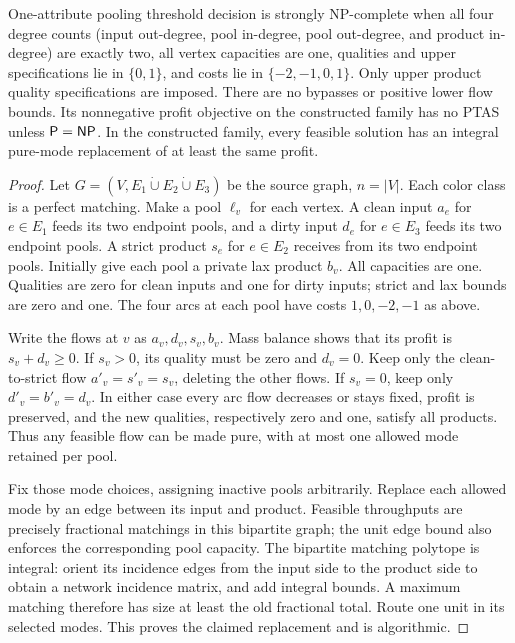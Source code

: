 \begin{theorem}\label{s3:all-two-thm}
One-attribute pooling threshold decision is strongly NP-complete when all
four degree counts (input out-degree, pool in-degree, pool out-degree,
and product in-degree)
are exactly two, all vertex capacities are one, qualities and upper
specifications lie in $\{0,1\}$, and costs lie in $\{-2,-1,0,1\}$.
Only upper product quality specifications are imposed. There are no
bypasses or positive lower flow bounds. Its nonnegative
profit objective on the constructed family has no PTAS unless
$\mathsf P=\mathsf{NP}$. In the constructed family, every feasible solution has an integral
pure-mode replacement of at least the same profit.
\end{theorem}
\begin{proof}
Let $G=(V,E_1\mathbin{\dot\cup}E_2\mathbin{\dot\cup}E_3)$ be the
source graph, $n=|V|$. Each color class is a perfect matching. Make a
pool $\ell_v$ for each vertex. A clean input $a_e$ for $e\in E_1$
feeds its two endpoint pools, and a dirty input $d_e$ for $e\in E_3$
feeds its two endpoint pools. A strict product $s_e$ for $e\in E_2$
receives from its two endpoint pools. Initially give each pool a private
lax product $b_v$. All capacities are one. Qualities are zero for clean
inputs and one for dirty inputs; strict and lax bounds are zero and one.
The four arcs at each pool have costs $1,0,-2,-1$ as above.

Write the flows at $v$ as $a_v,d_v,s_v,b_v$. Mass balance shows that
its profit is $s_v+d_v\ge0$. If $s_v>0$, its quality must be zero and
$d_v=0$. Keep only the clean-to-strict flow
$a'_v=s'_v=s_v$, deleting the other flows. If $s_v=0$, keep only
$d'_v=b'_v=d_v$. In either case every arc flow decreases or stays fixed,
profit is preserved, and the new qualities, respectively zero and one,
satisfy all products. Thus any feasible flow can be made pure, with at
most one allowed mode retained per pool.

Fix those mode choices, assigning inactive pools arbitrarily. Replace
each allowed mode by an edge between its input and product. Feasible
throughputs are precisely fractional matchings in this bipartite graph;
the unit edge bound also enforces the corresponding pool capacity.
The bipartite matching polytope is integral: orient its incidence edges
from the input side to the product side to obtain a network incidence
matrix, and add integral bounds. A maximum matching therefore has size
at least the old fractional total. Route one unit in its selected modes.
This proves the claimed replacement and is algorithmic.


\end{proof}
